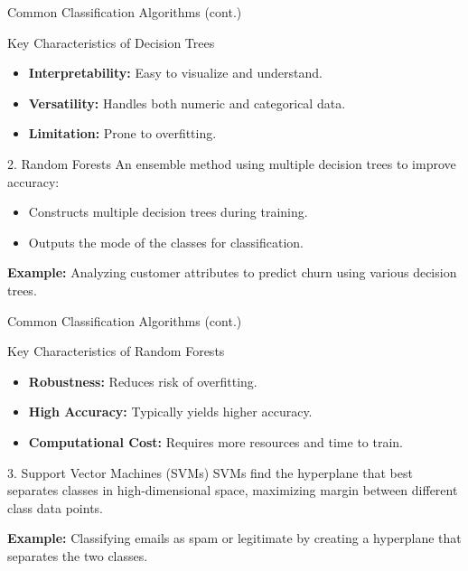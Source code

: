 \documentclass[aspectratio=169]{beamer}
\begin{document}
\begin{frame}[fragile]{Common Classification Algorithms (cont.)}
    \begin{block}{Key Characteristics of Decision Trees}
        \begin{itemize}
            \item \textbf{Interpretability:} Easy to visualize and understand.
            \item \textbf{Versatility:} Handles both numeric and categorical data.
            \item \textbf{Limitation:} Prone to overfitting.
        \end{itemize}
    \end{block}
    
    \begin{block}{2. Random Forests}
        An ensemble method using multiple decision trees to improve accuracy:
        \begin{itemize}
            \item Constructs multiple decision trees during training.
            \item Outputs the mode of the classes for classification.
        \end{itemize}
        \textbf{Example:} Analyzing customer attributes to predict churn using various decision trees.
    \end{block}
\end{frame}

\begin{frame}[fragile]{Common Classification Algorithms (cont.)}
    \begin{block}{Key Characteristics of Random Forests}
        \begin{itemize}
            \item \textbf{Robustness:} Reduces risk of overfitting.
            \item \textbf{High Accuracy:} Typically yields higher accuracy.
            \item \textbf{Computational Cost:} Requires more resources and time to train.
        \end{itemize}
    \end{block}
    
    \begin{block}{3. Support Vector Machines (SVMs)}
        SVMs find the hyperplane that best separates classes in high-dimensional space, maximizing margin between different class data points.
        
        \textbf{Example:} Classifying emails as spam or legitimate by creating a hyperplane that separates the two classes.
    \end{block}
\end{frame}
\end{document}
